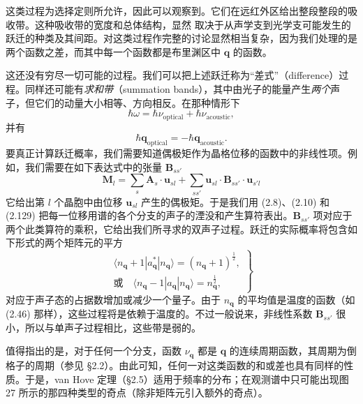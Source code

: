 
这类过程为选择定则所允许，因此可以观察到。它们在远红外区给出整段整段的吸收带。这种吸收带的宽度和总体结构，显然
取决于从声学支到光学支可能发生的跃迁的种类及其间距。对这类过程作完整的讨论显然相当复杂，因为我们处理的是两个函数之差，而其中每一个函数都是布里渊区中 $\mathbf{q}$ 的函数。

这还没有穷尽一切可能的过程。我们可以把上述跃迁称为“差式”（difference）过程。同样还可能有\emph{求和带}（summation bands），其中由光子的能量产生\emph{两个}声子，但它们的动量大小相等、方向相反。在那种情形下
\begin{equation*}
\hbar\omega = \hbar\nu_{\mathrm{optical}} + \hbar\nu_{\mathrm{acoustic}},\tag{8.68}
\end{equation*}
并有
\begin{equation*}
\hbar\mathbf{q}_{\mathrm{optical}} = -\hbar\mathbf{q}_{\mathrm{acoustic}}.
\end{equation*}
要真正计算跃迁概率，我们需要知道偶极矩作为晶格位移的函数中的非线性项。例如，我们需要在如下表达式中的张量 $\mathbf{B}_{ss'}$
\begin{equation*}
\mathbf{M}_l = \sum_s \mathbf{A}_s\cdot\mathbf{u}_{sl} + \sum_{ss'} \mathbf{u}_{sl}\cdot\mathbf{B}_{ss'}\cdot\mathbf{u}_{s'l}\tag{8.69}
\end{equation*}
它给出第 $l$ 个晶胞中由位移 $\mathbf{u}_{sl}$ 产生的偶极矩。于是我们用 (2.8)、(2.10) 和 (2.129) 把每一位移用谱的各个分支的声子的湮没和产生算符表出。$\mathbf{B}_{ss'}$ 项对应于两个此类算符的乘积，它给出我们所寻求的双声子过程。跃迁的实际概率将包含如下形式的两个矩阵元的平方
\begin{equation*}
\left.
\begin{gathered}
\langle n_{\mathbf{q}}+1|a_{\mathbf{q}}^{*}|n_{\mathbf{q}}\rangle = (n_{\mathbf{q}}+1)^{\frac{1}{2}},\\
\text{或}\quad \langle n_{\mathbf{q}}-1|a_{\mathbf{q}}|n_{\mathbf{q}}\rangle = n_{\mathbf{q}}^{\frac{1}{2}},
\end{gathered}
\right\}
\tag{8.70}
\end{equation*}
对应于声子态的占据数增加或减少一个量子。由于 $n_{\mathbf{q}}$ 的平均值是温度的函数（如 (2.46) 那样），这些过程将是依赖于温度的。不过一般说来，非线性系数 $\mathbf{B}_{ss'}$ 很小，所以与单声子过程相比，这些带是弱的。

值得指出的是，对于任何一个分支，函数 $\nu_{\mathbf{q}}$ 都是 $\mathbf{q}$ 的连续周期函数，其周期为倒格子的周期（参见 §2.2）。由此可知，任何一对这类函数的和或差也具有同样的性质。于是，van Hove 定理（§2.5）适用于频率的分布；在观测谱中只可能出现图 27 所示的那四种类型的奇点（除非矩阵元引入额外的奇点）。
